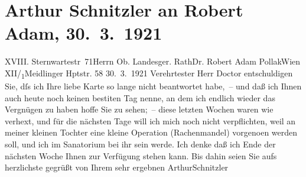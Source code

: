 

         
         \renewcommand{\erwaehntePersonen}{Personen: Robert Adam, Lili Schnitzler}
         \renewcommand{\erwaehnteOrte}{Orte: IX., Alsergrund, Meidlinger Hauptstraße, Sanatorium Loew, Sternwartestraße, Wien, XII., Meidling}
         \renewcommand{\erwaehnteWerke}{}
               \section[Arthur Schnitzler an Robert Adam, 30. 3. 1921]{ Arthur Schnitzler an Robert Adam, 30. 3. 1921}\nopagebreak{}\rehead{ }\begin{ledgroupsized}[t]{13cm}\normalsize\beginnumbering \toendnotes[C]{\smallbreak\pagebreak[2]} 
\toendnotes[C]{\smallbreak}\pstart{}{\pb}XVIII. Sternwartestr 71\pend{}{\bigskip}\pstart{}Herrn Ob. Landesger. Rath\pend{}\pstart{}Dr. Robert Adam Pollak\pend{}\pstart{}Wien XII/\textsubscript{1}\pend{}\pstart{}Meidlinger Hptstr. 58\pend{}{\bigskip}\pstart
           \raggedleft{}{\pb}30. 3. 1921\pend
           \pstart{}Verehrtester Herr Doctor\pend\pstart
           entschuldigen Sie, dſs ich Ihre liebe Karte so lange nicht beantwortet habe, – und
               daß ich Ihnen auch heute noch keinen besti{\geminationm}ten Tag
               nenne, an dem ich endlich wieder das Vergnügen zu haben hoffe Sie zu sehen; – diese
               letzten Wochen waren wie verhext, und für die nächsten Tage will ich mich noch nicht
               verpflichten, weil an meiner kleinen Tochter eine kleine Operation (Rachenmandel) vorgeno{\geminationm}en werden soll, und ich im Sanatorium bei ihr sein {\pb}werde. Ich denke daß ich Ende der \introOben{}nächsten\introOben{} Woche Ihnen zur Verfügung stehen kann. Bis dahin seien Sie aufs
               herzlichste gegrüßt von Ihrem sehr ergebnen\pend
           \pstart \spacefill\mbox{ArthurSchnitzler}\pend{}
         
         \endnumbering{}\end{ledgroupsized}  \newcommand{\dateiname}{L02365}\newcommand{\titel}{Arthur Schnitzler an Robert Adam, 30. 3. 1921}\newcommand{\editorInnen}{Martin Anton Müller und Gerd-Hermann Susen}
      